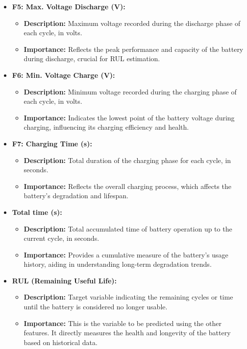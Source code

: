 \begin{itemize}
\begin{itemize}
    \end{itemize}
    \item \textbf{F5: Max. Voltage Discharge (V):} 
    \begin{itemize}
        \item \textbf{Description:} Maximum voltage recorded during the discharge phase of each cycle, in volts.
        \item \textbf{Importance:} Reflects the peak performance and capacity of the battery during discharge, crucial for RUL estimation.
    \end{itemize}
    \item \textbf{F6: Min. Voltage Charge (V):} 
    \begin{itemize}
        \item \textbf{Description:} Minimum voltage recorded during the charging phase of each cycle, in volts.
        \item \textbf{Importance:} Indicates the lowest point of the battery voltage during charging, influencing its charging efficiency and health.
    \end{itemize}
    \item \textbf{F7: Charging Time (s):} 
    \begin{itemize}
        \item \textbf{Description:} Total duration of the charging phase for each cycle, in seconds.
        \item \textbf{Importance:} Reflects the overall charging process, which affects the battery's degradation and lifespan.
    \end{itemize}
    \item \textbf{Total time (s):} 
    \begin{itemize}
        \item \textbf{Description:} Total accumulated time of battery operation up to the current cycle, in seconds.
        \item \textbf{Importance:} Provides a cumulative measure of the battery's usage history, aiding in understanding long-term degradation trends.
    \end{itemize}
    \item \textbf{RUL (Remaining Useful Life):} 
    \begin{itemize}
        \item \textbf{Description:} Target variable indicating the remaining cycles or time until the battery is considered no longer usable.
        \item \textbf{Importance:} This is the variable to be predicted using the other features. It directly measures the health and longevity of the battery based on historical data.
    \end{itemize}
\end{itemize}

